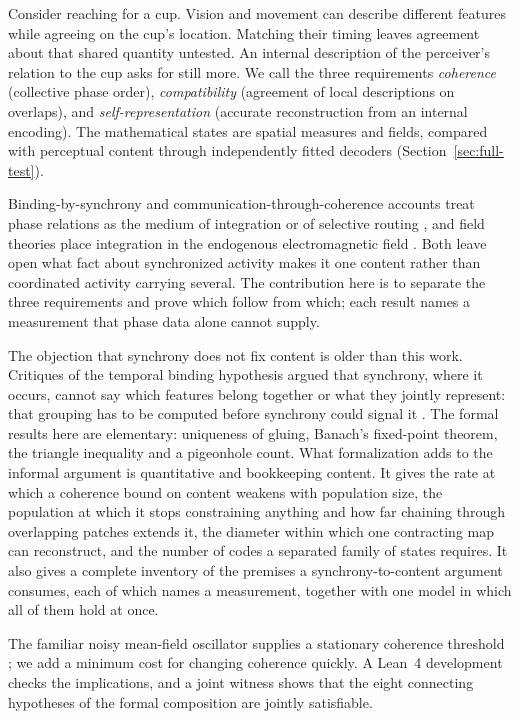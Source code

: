 \documentclass[12pt]{article}
\renewcommand{\cite}[1]{\citep{#1}}
\begin{document}
Consider reaching for a cup. Vision and movement can describe different
features while agreeing on the cup's location. Matching their timing leaves
agreement about that shared quantity untested. An internal description of the
perceiver's relation to the cup asks for still more. We call the three
requirements \emph{coherence} (collective phase order), \emph{compatibility}
(agreement of local descriptions on overlaps), and \emph{self-representation}
(accurate reconstruction from an internal encoding). The mathematical states
are spatial measures and fields, compared with perceptual content through
independently fitted decoders (Section~\ref{sec:full-test}).

Binding-by-synchrony and communication-through-coherence accounts treat phase
relations as the medium of integration or of selective routing
\cite{singer1995,fries2015}, and field theories place integration in the
endogenous electromagnetic field \cite{mcfadden2020,pockett2012}. Both leave
open what fact about synchronized activity makes it one content rather than
coordinated activity carrying several. The contribution here is to separate the
three requirements and prove which follow from which; each result names a
measurement that phase data alone cannot supply.

The objection that synchrony does not fix content is older than this work.
Critiques of the temporal binding hypothesis argued that synchrony, where it
occurs, cannot say which features belong together or what they jointly
represent: that grouping has to be computed before synchrony could signal it
\cite{shadlen1999}. The formal results here are elementary: uniqueness of
gluing, Banach's fixed-point theorem, the triangle inequality and a pigeonhole
count. What formalization adds to the informal argument is quantitative and
bookkeeping content. It gives the rate at which a coherence bound on content
weakens with population size, the population at which it stops constraining
anything and how far chaining through overlapping patches extends it, the diameter within which one contracting map can reconstruct, and
the number of codes a separated family of states requires. It also gives a
complete inventory of the premises a synchrony-to-content argument consumes,
each of which names a measurement, together with one model in which all of
them hold at once.

The familiar noisy mean-field oscillator supplies a stationary coherence
threshold \cite{sakaguchi1988,strogatz1991}; we add a minimum cost for changing
coherence quickly. A Lean~4 development checks the implications, and a joint
witness shows that the eight connecting hypotheses of the formal composition
are jointly satisfiable.
\end{document}
